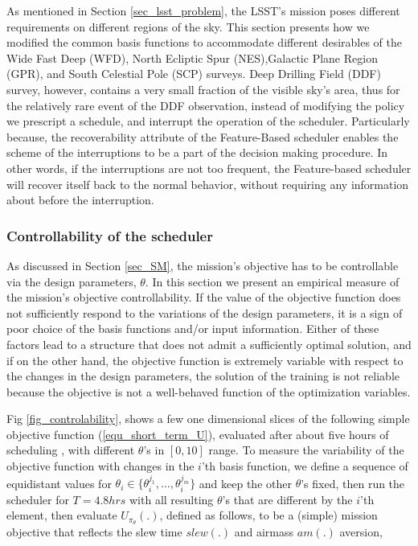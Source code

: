 \documentclass[12pt,aas_macros]{article}
\theoremstyle{definition}
\begin{document}
As mentioned in Section \ref{sec_lsst_problem}, the LSST's mission poses different requirements on different regions of the sky. This section presents how we modified the common basis functions to accommodate different desirables of the Wide Fast Deep (WFD), North Ecliptic Spur (NES),Galactic Plane Region (GPR), and South Celestial Pole (SCP)  surveys. Deep Drilling Field (DDF) survey, however, contains a very small fraction of the visible sky's area, thus for the relatively rare event of the DDF observation, instead of modifying the policy we prescript a schedule, and interrupt the operation of the scheduler. Particularly because, the recoverability attribute of the Feature-Based scheduler enables the scheme of the interruptions to be a part of the decision making procedure. In other words, if the interruptions are not too frequent, the Feature-based scheduler will recover itself back to the normal behavior, without requiring any information about before the interruption. 

\subsubsection{Controllability of the scheduler}\label{sec_sim_cont}

As discussed in Section \ref{sec_SM}, the mission's objective has to be controllable via the design parameters, $\theta$. In this section we present an empirical measure of the mission's objective controllability. If the value of the objective function does not sufficiently respond to the variations of the design parameters, it is a sign of poor choice of the basis functions and/or input information. Either of these factors lead to a structure that does not admit a sufficiently optimal solution, and if on the other hand, the objective function is extremely variable with respect to the changes in the design parameters, the solution of the training is not reliable because the objective is not a well-behaved function of the optimization variables.

Fig \ref{fig_controlability}, shows a few one dimensional slices of the following simple objective function (\ref{equ_short_term_U}), evaluated after about five hours of scheduling , with different $\theta$'s in $[0,10]$ range. To measure the variability of the objective function with changes in the $i$'th basis function, we define a sequence of equidistant values for $\theta_i \in \{\theta_i^{j_1},\dots,\theta_i^{j_m}\}$ and keep the other $\theta$'s fixed, then run the scheduler for $T = 4.8 hrs$ with all resulting $\theta$'s that are different by the $i$'th element, then evaluate $U_{\pi_{\theta}}(.)$, defined as follows, to be a (simple) mission objective that reflects the slew time $slew(.)$ and airmass $am(.)$ aversion,
\end{document}
